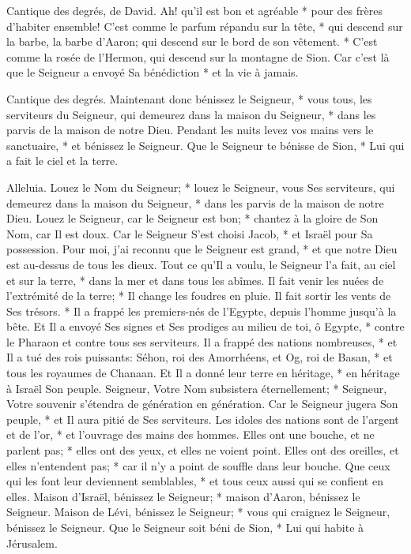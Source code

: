 Cantique des degrés, de David. Ah! qu'il est bon et agréable * pour des frères d'habiter ensemble!
C'est comme le parfum répandu sur la tête, * qui descend sur la barbe, la barbe d'Aaron; qui descend sur le bord de son vêtement. *
C'est comme la rosée de l'Hermon, qui descend sur la montagne de Sion. Car c'est là que le Seigneur a envoyé Sa bénédiction * et la vie à jamais.

Cantique des degrés. Maintenant donc bénissez le Seigneur, * vous tous, les serviteurs du Seigneur, qui demeurez dans la maison du Seigneur, * dans les parvis de la maison de notre Dieu.
Pendant les nuits levez vos mains vers le sanctuaire, * et bénissez le Seigneur.
Que le Seigneur te bénisse de Sion, * Lui qui a fait le ciel et la terre.

Alleluia. Louez le Nom du Seigneur; * louez le Seigneur, vous Ses serviteurs,
qui demeurez dans la maison du Seigneur, * dans les parvis de la maison de notre Dieu.
Louez le Seigneur, car le Seigneur est bon; * chantez à la gloire de Son Nom, car Il est doux.
Car le Seigneur S'est choisi Jacob, * et Israël pour Sa possession.
Pour moi, j'ai reconnu que le Seigneur est grand, * et que notre Dieu est au-dessus de tous les dieux.
Tout ce qu'Il a voulu, le Seigneur l'a fait, au ciel et sur la terre, * dans la mer et dans tous les abîmes.
Il fait venir les nuées de l'extrémité de la terre; * Il change les foudres en pluie. Il fait sortir les vents de Ses trésors. *
Il a frappé les premiers-nés de l'Egypte, depuis l'homme jusqu'à la bête.
Et Il a envoyé Ses signes et Ses prodiges au milieu de toi, ô Egypte, * contre le Pharaon et contre tous ses serviteurs.
Il a frappé des nations nombreuses, * et Il a tué des rois puissants:
Séhon, roi des Amorrhéens, et Og, roi de Basan, * et tous les royaumes de Chanaan.
Et Il a donné leur terre en héritage, * en héritage à Israël Son peuple.
Seigneur, Votre Nom subsistera éternellement; * Seigneur, Votre souvenir s'étendra de génération en génération.
Car le Seigneur jugera Son peuple, * et Il aura pitié de Ses serviteurs.
Les idoles des nations sont de l'argent et de l'or, * et l'ouvrage des mains des hommes.
Elles ont une bouche, et ne parlent pas; * elles ont des yeux, et elles ne voient point.
Elles ont des oreilles, et elles n'entendent pas; * car il n'y a point de souffle dans leur bouche.
Que ceux qui les font leur deviennent semblables, * et tous ceux aussi qui se confient en elles.
Maison d'Israël, bénissez le Seigneur; * maison d'Aaron, bénissez le Seigneur.
Maison de Lévi, bénissez le Seigneur; * vous qui craignez le Seigneur, bénissez le Seigneur.
Que le Seigneur soit béni de Sion, * Lui qui habite à Jérusalem.


